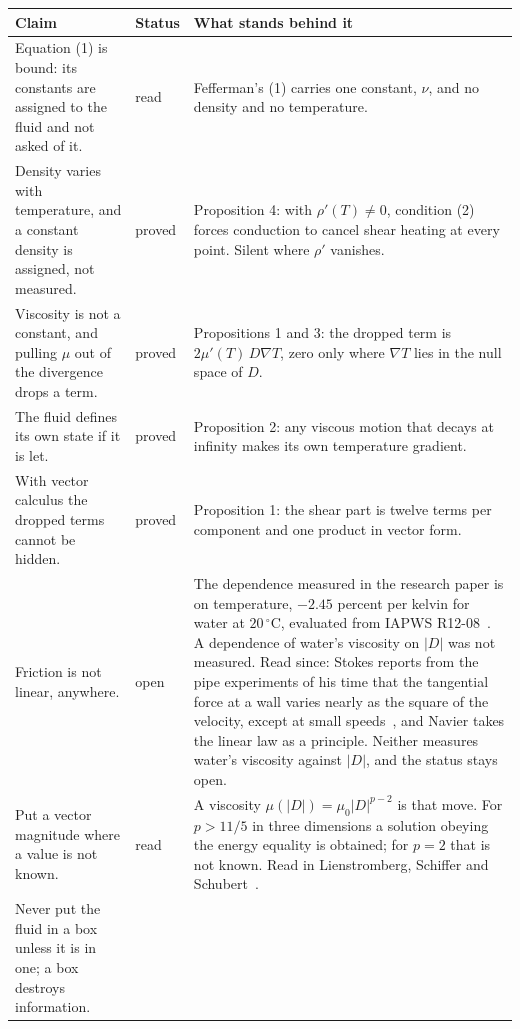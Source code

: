 \begin{longtable}{@{}>{\raggedright\arraybackslash}p{}>{\raggedright\arraybackslash}p{}>{\raggedright\arraybackslash}p{}@{}}
\toprule
Claim & Status & What stands behind it \\
\midrule
\endhead
\bottomrule
\endfoot
Equation (1) is bound: its constants are assigned to the fluid and not asked of it.
& read
& Fefferman's (1) carries one constant, $\nu$, and no density and no temperature. \\[0.6em]
Density varies with temperature, and a constant density is assigned, not measured.
& proved
& Proposition 4: with $\rho'(T)\neq 0$, condition (2) forces conduction to cancel shear heating at
every point. Silent where $\rho'$ vanishes. \\[0.6em]
Viscosity is not a constant, and pulling $\mu$ out of the divergence drops a term.
& proved
& Propositions 1 and 3: the dropped term is $2\mu'(T)\,D\nabla T$, zero only where $\nabla T$ lies
in the null space of $D$. \\[0.6em]
The fluid defines its own state if it is let.
& proved
& Proposition 2: any viscous motion that decays at infinity makes its own temperature
gradient. \\[0.6em]
With vector calculus the dropped terms cannot be hidden.
& proved
& Proposition 1: the shear part is twelve terms per component and one product in vector
form. \\[0.6em]
Friction is not linear, anywhere.
& open
& The dependence measured in the research paper is on temperature, $-2.45$ percent per kelvin
for water at $20\,^\circ$C, evaluated from IAPWS R12-08~\cite{src:IAPWS-R12-08}. A dependence of water's
viscosity on $|D|$ was not measured. Read since: Stokes reports from the pipe experiments of
his time that the tangential force at a wall varies nearly as the square of the velocity, except at
small speeds~\cite{src:Stokes-1845}, and Navier takes the linear law as a principle. Neither
measures water's viscosity against $|D|$, and the status stays open. \\[0.6em]
Put a vector magnitude where a value is not known.
& read
& A viscosity $\mu(|D|) = \mu_0|D|^{p-2}$ is that move. For $p > 11/5$ in three dimensions a
solution obeying the energy equality is obtained; for $p = 2$ that is not known. Read in
Lienstromberg, Schiffer and Schubert~\cite{src:Lienstromberg-Schiffer-Schubert-2025}. \\[0.6em]
Never put the fluid in a box unless it is in one; a box destroys information.

\end{longtable}
